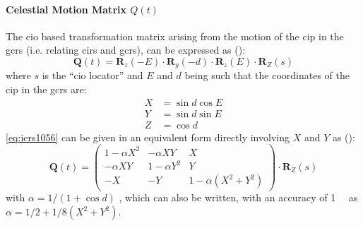 \paragraph{Celestial Motion Matrix $Q(t)$}\label{par:celestial-motion-matrix}
The \gls{cio} based transformation matrix arising from the motion of the \gls{cip} 
in the \gls{gcrs} (i.e. relating \gls{cirs} and \gls{gcrs}), can be expressed as
(\cite{iers2010}):
\begin{equation}
  \bm{Q}(t) = \bm{R}_z (-E) \cdot 
              \bm{R}_y (-d) \cdot 
              \bm{R}_z (E) \cdot 
              \bm{R}_Z (s)
  \label{eq:iers1056}
\end{equation}
where $s$ is the ``\gls{cio} locator'' and $E$ and $d$ being such that the 
coordinates of the \gls{cip} in the \gls{gcrs} are:
\begin{equation}
  \begin{aligned}
    X & = \sin{d} \cos{E} \\
    Y & = \sin{d} \sin{E} \\
    Z & = \cos{d}
  \end{aligned}
\end{equation}
\ref{eq:iers1056} can be given in an equivalent form directly involving $X$ and 
$Y$ as (\cite{iers2010}):
\begin{equation}
  \bm{Q}(t) = \begin{pmatrix}
    1-\alpha X^2 & -\alpha XY & X \\
    -\alpha XY & 1-\alpha Y^2 & Y \\
    -X & -Y & 1-\alpha (X^2 + Y^2) \end{pmatrix}
    \cdot \bm{R}_Z (s)
    \label{eq:iers10510}
\end{equation}
with $\alpha = 1/(1+\cos{d})$ , which can also be written, with an accuracy of 
\SI{1}{\micro\larcsecond} as $\alpha = 1/2 + 1/8(X^2 + Y^2)$.

